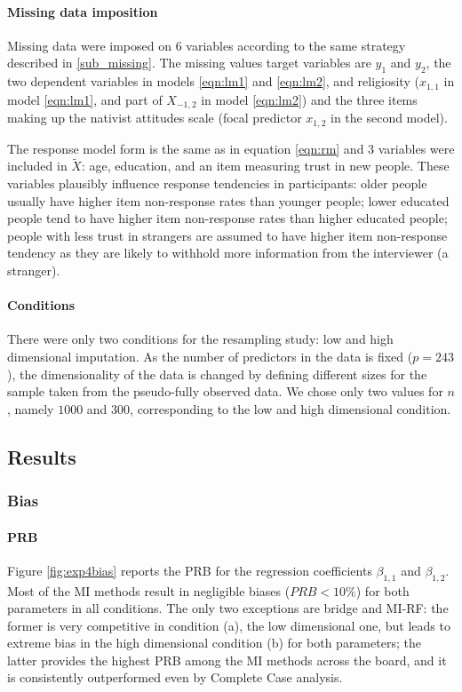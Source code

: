 \paragraph{Missing data imposition}

	Missing data were imposed on 6 variables according to the same strategy described in \ref{sub_missing}.
	The missing values target variables are $y_1$ and $y_2$, the two dependent variables in models 
	\ref{eqn:lm1} and \ref{eqn:lm2}, and
	religiosity ($x_{1,1}$ in model \ref{eqn:lm1}, and part of $X_{-1,2}$ in model \ref{eqn:lm2}) 
	and the three items making up the nativist attitudes scale (focal predictor $x_{1,2}$ in the second model).

	The response model form is the same as in equation \ref{eqn:rm} and 3 variables were included in $\tilde{X}$: 
	age, education, and an item measuring trust in new people. 
	These variables plausibly influence response tendencies in participants: 
	older people usually have higher item non-response rates than younger people;
	lower educated people tend to have higher item non-response rates than higher educated people;
	people with less trust in strangers are assumed to have higher item non-response tendency as they
	are likely to withhold more information from the interviewer (a stranger).

\paragraph{Conditions}
	There were only two conditions for the resampling study: low and high dimensional imputation.
	As the number of predictors in the data is fixed ($p = 243$), the dimensionality of the data is
	changed by defining different sizes for the sample taken from the pseudo-fully observed data.
	We chose only two values for $n$, namely $1000$ and $300$, corresponding to the low and high 
	dimensional condition.

\subsection{Results}
\subsubsection{Bias}

	\paragraph{PRB}
	Figure \ref{fig:exp4bias} reports the PRB for the regression coefficients $\beta_{1,1}$ and $\beta_{1,2}$.
	Most of the MI methods result in negligible biases ($PRB < 10\%$) for both parameters in all conditions.
	The only two exceptions are bridge and MI-RF: 
	the former is very competitive in condition (a), the low dimensional one, but leads to extreme bias in 
	the high dimensional condition (b) for both parameters; 
	the latter provides the highest PRB among the MI methods across the board, and it is consistently outperformed 
	even by Complete Case analysis.

